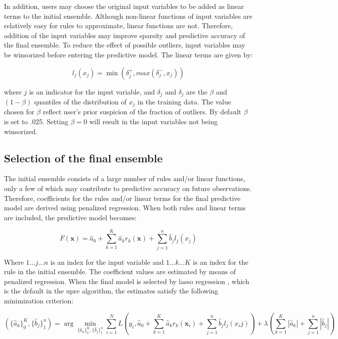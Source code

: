 \documentclass[nobf,doc]{apa}
\begin{document}
In addition, users may choose the original input variables to be added as linear terms to the initial ensemble. Although non-linear functions of input variables are relatively easy for rules to approximate, linear functions are not. Therefore, addition of the input variables may improve sparsity and predictive accuracy of the final ensemble. To reduce the effect of possible outliers, input variables may be winsorized before entering the predictive model. The linear terms are given by: 

\begin{equation}
	l_j(x_j) = \min(\delta_j^+, max(\delta_j^-, x_j))
	\label{eq:linear_terms}	
\end{equation}

where $j$ is an indicator for the input variable, and $\delta_j$ and $\delta_j$ are the $\beta$ and $(1-\beta)$ quantiles of the distribution of $x_j$ in the training data. The value chosen for $\beta$ reflect user's prior suspicion of the fraction of outliers. By default $\beta$ is set to .025. Setting $\beta = 0$ will result in the input variables not being winsorized. 


\subsection{Selection of the final ensemble}

The initial ensemble consists of a large number of rules and/or linear functions, only a few of which may contribute to predictive accuracy on future observations. Therefore, coefficients for the rules and/or linear terms for the final predictive model are derived using penalized regression. When both rules and linear terms are included, the predictive model becomes:

\begin{equation}
	F(\mathbf{x}) = \hat{a}_0 + \sum_{k=1}^K{\hat{a}_k r_k(\mathbf{x}) + \sum_{j=1}^n{\hat{b}_j l_j(x_j)}} 
	\label{eq:predictive_model}
\end{equation} 

Where $1 \dots j \dots n$ is an index for the input variable and $1 \dots k \dots K$ is an index for the rule in the initial ensemble. The coefficient values are estimated by means of penalized regression. When the final model is selected by lasso regression \cite{Tibs96}, which is the default in the upre algorithm, the estimates satisfy the following minimization criterion: 

\begin{equation}
	( \{ \hat{a}_k \}^K_0 , \{ \hat{b}_j \}^n_1  ) = 
	\arg\min_{ \{ \hat{a}_k \}^K_0 , \{ \hat{b}_j \}^n_1 } \sum_{i=1}^N{L \left( 
		y_i, \hat{a}_0 + \sum_{k=1}^K{\hat{a}_k r_k(\mathbf{x}_i) + \sum_{j=1}^n{\hat{b}_j l_j(x_ij)}}  \right)} +
	\lambda \left( \sum_{k=1}^K{| \hat{a}_k |} + \sum_{j=1}^n{| \hat{b}_j |} \right) 
	\label{eq:lasso_regression}
\end{equation}
\end{document}
